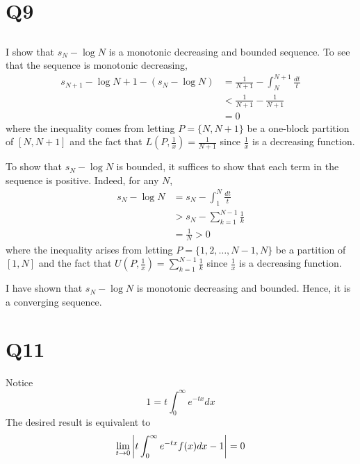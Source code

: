 \documentclass[12pt]{article}
\begin{document}
\section*{Q9}
\setcounter{subsection}{0}
\subsection{}
I show that $s_N - \log{N}$ is a monotonic decreasing and bounded sequence.
To see that the sequence is monotonic decreasing, 
\begin{align*}
  s_{N + 1} - \log{N + 1} - (s_{N} - \log{N}) & = \frac{1}{N + 1} - \int_{N}^{N + 1} \frac{dt}{t} \\ 
                                              & < \frac{1}{N + 1} - \frac{1}{N + 1} \\ 
                                              & = 0
\end{align*}
where the inequality comes from letting $P = \{N, N + 1\}$ be a one-block partition of $[N, N + 1]$ and the fact that $L(P, \frac{1}{x}) = \frac{1}{N + 1}$ since $\frac{1}{x}$ is a decreasing function. 

To show that $s_N - \log{N}$ is bounded, it suffices to show that each term in the sequence is positive. 
Indeed, for any $N$, 
\begin{align*}
  s_N - \log{N} & = s_N - \int_{1}^{N} \frac{dt}{t} \\ 
                & > s_N - \sum_{k = 1}^{N - 1} \frac{1}{k} \\ 
                & = \frac{1}{N} > 0
\end{align*}
where the inequality arises from letting $P = \{1, 2, \ldots, N - 1, N\}$ be a partition of $[1, N]$ and the fact that $U(P, \frac{1}{x}) = \sum_{k = 1}^{N - 1} \frac{1}{k}$ since $\frac{1}{x}$ is a decreasing function. 

I have shown that $s_N - \log{N}$ is monotonic decreasing and bounded. 
Hence, it is a converging sequence. 

\section*{Q11}
Notice 
\begin{equation} \label{eq:one}
  1 = t\int_{0}^{\infty} e^{-tx} dx
\end{equation}
The desired result is equivalent to 
\begin{equation} \label{eq:end_res} 
  \lim_{t \rightarrow 0} \left|t \int_{0}^{\infty} e^{-tx} f(x) dx - 1\right| = 0
\end{equation}
\end{document}
